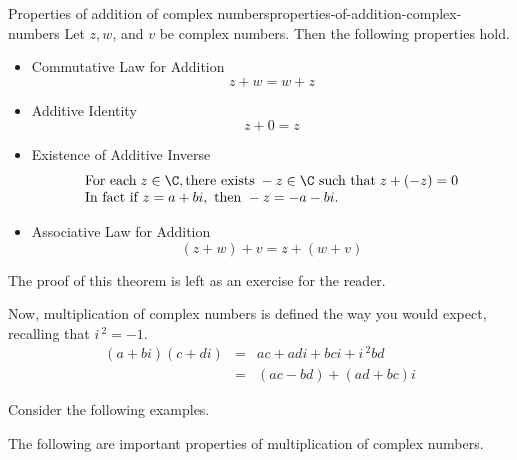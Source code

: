 \begin{theorem}{Properties of addition of complex numbers}{properties-of-addition-complex-numbers}
  Let $z,w$, and $v$ be complex numbers. Then the following properties hold.
  \begin{itemize}
  \item Commutative Law for Addition
    \begin{equation*}
      z+w=w+z
    \end{equation*}

  \item Additive Identity
    \begin{equation*}
      z+0=z
    \end{equation*}

  \item Existence of Additive Inverse
    \begin{equation*}
      \begin{array}{l}
        \mbox{For each} \; z\in \C, \mbox{there exists}\; -z\in \C \mbox{ such that}\; 
        z+(-z) =0 \\
        \mbox{In fact if } z=a+bi, \mbox{ then } -z=-a-bi.
      \end{array}
    \end{equation*}

  \item Associative Law for Addition
    \begin{equation*}
      (z+w) +v= z +(w+v)
    \end{equation*}
  \end{itemize}
\end{theorem}

The proof of this theorem is left as an exercise for the reader.

Now, multiplication of complex numbers is defined the way you would expect, recalling that $i\,^{2} = -1$.
\begin{eqnarray*}
  (a+bi) (c+di) &=&ac+adi+bci+i\,^{2}bd \\
                &=&(ac-bd) +(ad + bc)i 
\end{eqnarray*}

Consider the following examples.

The following are important properties of multiplication of complex numbers.

